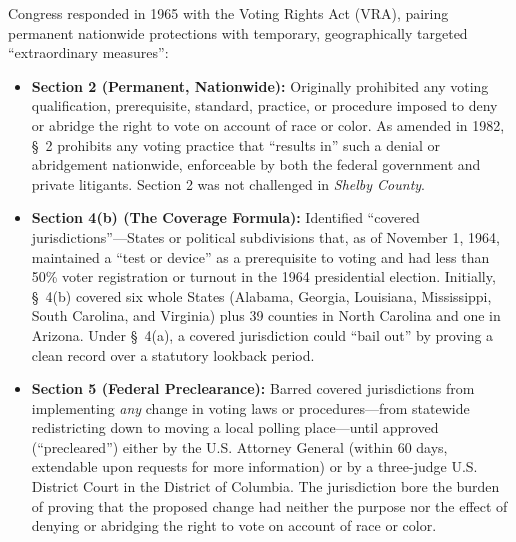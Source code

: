 \documentclass[12pt]{article}
\begin{document}
Congress responded in 1965 with the Voting Rights Act (VRA), pairing permanent nationwide protections with temporary, geographically targeted ``extraordinary measures'':
\begin{itemize}
    \item \textbf{Section 2 (Permanent, Nationwide):} Originally prohibited any voting qualification, prerequisite, standard, practice, or procedure imposed to deny or abridge the right to vote on account of race or color. As amended in 1982, \S~2 prohibits any voting practice that ``results in'' such a denial or abridgement nationwide, enforceable by both the federal government and private litigants. Section 2 was not challenged in \emph{Shelby County}.
    \item \textbf{Section 4(b) (The Coverage Formula):} Identified ``covered jurisdictions''---States or political subdivisions that, as of November 1, 1964, maintained a ``test or device'' as a prerequisite to voting and had less than 50\% voter registration or turnout in the 1964 presidential election. Initially, \S~4(b) covered six whole States (Alabama, Georgia, Louisiana, Mississippi, South Carolina, and Virginia) plus 39 counties in North Carolina and one in Arizona. Under \S~4(a), a covered jurisdiction could ``bail out'' by proving a clean record over a statutory lookback period.
    \item \textbf{Section 5 (Federal Preclearance):} Barred covered jurisdictions from implementing \emph{any} change in voting laws or procedures---from statewide redistricting down to moving a local polling place---until approved (``precleared'') either by the U.S. Attorney General (within 60 days, extendable upon requests for more information) or by a three-judge U.S. District Court in the District of Columbia. The jurisdiction bore the burden of proving that the proposed change had neither the purpose nor the effect of denying or abridging the right to vote on account of race or color.
\end{itemize}
\end{document}
